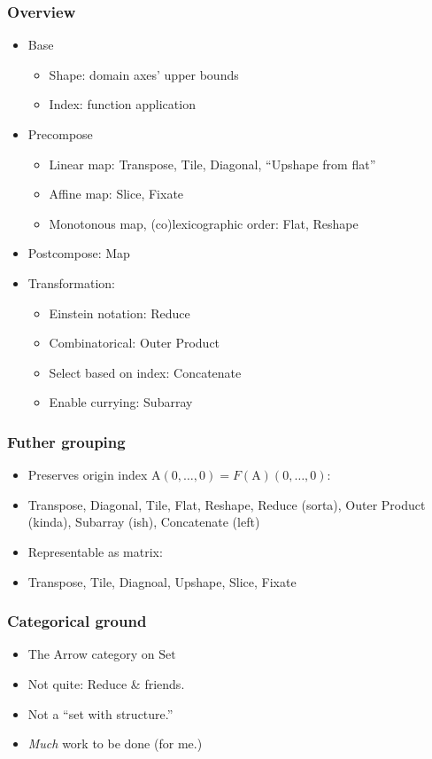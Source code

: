 \documentclass[xetex,mathserif,serif]{beamer}
\newcommand\mrm[1]{\mathrm{#1}}
\newcommand\brm[1]{\bm{\mrm{#1}}}
\begin{document}
\begin{frame}
  \frametitle{Overview}
  \begin{itemize}%
    \item Base
      \begin{itemize}%
        \item Shape: domain axes' upper bounds
        \item Index: function application
      \end{itemize}
    \item Precompose
      \begin{itemize}%
        \item Linear map: Transpose, Tile, Diagonal, ``Upshape from flat''
        \item Affine map: Slice, Fixate
        \item Monotonous map, (co)lexicographic order: Flat, Reshape
      \end{itemize}
    \item Postcompose: Map
    \item Transformation:
      \begin{itemize}%
        \item Einstein notation: Reduce
        \item Combinatorical: Outer Product
        \item Select based on index: Concatenate
        \item Enable currying: Subarray
      \end{itemize}
  \end{itemize}
\end{frame}

\begin{frame}
  \frametitle{Futher grouping}
  \begin{itemize}%
    \item Preserves origin index \(\brm A (0,\dots,0) = F(\brm A)(0,\dots,0)\):
    \item Transpose, Diagonal, Tile, Flat, Reshape, Reduce (sorta),
      Outer Product (kinda), Subarray (ish), Concatenate (left)
    \item Representable as matrix:
    \item Transpose, Tile, Diagnoal, Upshape, Slice, Fixate
  \end{itemize}
\end{frame}

\begin{frame}
  \frametitle{Categorical ground}
  \begin{itemize}%
    \item The Arrow category on \(\brm{Set}\)
    \item Not quite: Reduce \& friends.
    \item Not a ``set with structure.''
    \item \emph{Much} work to be done (for me.)
  \end{itemize}
\end{frame}
\end{document}
